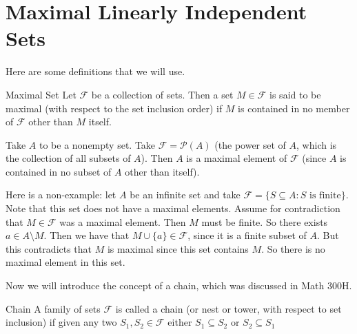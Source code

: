\documentclass[main.tex]{subfiles}
\begin{document}
    \section{Maximal Linearly Independent Sets}
    Here are some definitions that we will use. 
    \begin{defn}{Maximal Set}{}
        Let $\mathcal{F}$ be a collection of sets. Then a set $M\in \mathcal{F}$ is said to be maximal (with respect to the set inclusion order) if $M$ is contained in no member of $\mathcal{F}$ other than $M$ itself.
    \end{defn}
    \begin{example}{}{}
        Take $A$ to be a nonempty set. Take $\mathcal{F} = \mathcal{P}(A)$ (the power set of $A$, which is the collection of all subsets of $A$). Then $A$ is a maximal element of $\mathcal{F}$ (since $A$ is contained in no subset of $A$ other than itself). \bigbreak 

        Here is a non-example: let $A$ be an infinite set and take $\mathcal{F} = \{S \subseteq A : S \text{ is finite}\}$. Note that this set does not have a maximal elements. Assume for contradiction that $M\in \mathcal{F}$ was a maximal element. Then $M$ must be finite. So there exists $a\in A\setminus M$. Then we have that $M\cup \{a\} \in \mathcal{F}$, since it is a finite subset of $A$. But this contradicts that $M$ is maximal since this set contains $M$. So there is no maximal element in this set.
    \end{example}

    Now we will introduce the concept of a chain, which was discussed in Math 300H. 
    \begin{defn}{Chain}{}
        A family of sets $\mathcal{F}$ is called a chain (or nest or tower, with respect to set inclusion) if given any two $S_1, S_2 \in \mathcal{F}$ either $S_1 \subseteq S_2$ or $S_2 \subseteq S_1$
    \end{defn}
\end{document}
